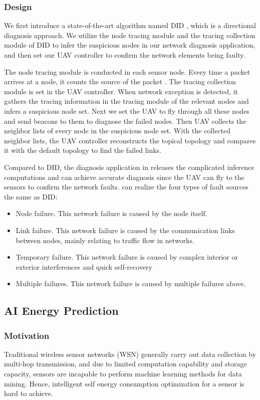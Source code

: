 \subsubsection{Design}

We first introduce a state-of-the-art algorithm named DID 
\cite{gong2015directional}, which is a directional diagnosis approach.
We utilize the node tracing module and the tracing collection module of DID
to infer the suspicious nodes in our network diagnosis application, 
and then set our UAV controller to confirm the network elements being faulty.

The node tracing module is conducted in each sensor node. 
Every time a packet arrives at a node, it counts
the source of the packet . The tracing collection module
is set in the UAV controller. When network exception is detected, 
it gathers the tracing information in the tracing module of the relevant nodes
and infers a suspicious node set. Next we set the UAV to fly through all these nodes 
and send beacons to them to diagnose the failed nodes. 
Then UAV collects the neighbor lists of every node in the suspicious node set.
With the collected neighbor lists, the UAV controller reconstructs the topical topology and 
compares it with the default topology to find the failed links.

Compared to DID, the diagnosis application in {\sdn} releases the complicated inference
computations and can achieve accurate diagnosis since the UAV can fly to the sensors 
to confirm the network faults. {\sdn} can realize the four types of fault sources the same as DID:  
\begin{itemize}
\item	Node failure. This network failure is caused by the node itself.
\item	Link failure. This network failure is caused by the communication links 
between nodes, mainly relating to traffic flow in networks.
\item	Temporary failure. This  network failure is caused by complex interior or exterior 
interferences and quick self-recovery
\item	Multiple failures. This  network failure is caused by multiple failures above.
\end{itemize}

\subsection{AI Energy Prediction}

\subsubsection{Motivation}
Traditional wireless sensor networks (WSN)  generally carry out data 
collection by multi-hop transmission,
and due to limited computation capability and storage capacity, sensors are incapable
to perform machine learning methods for data mining. 
Hence, intelligent self energy consumption optimization for a sensor is hard to achieve.

